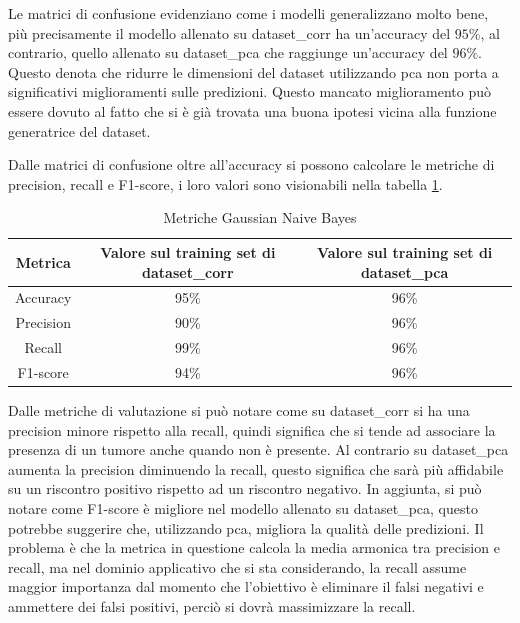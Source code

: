 Le matrici di confusione evidenziano come i modelli generalizzano molto bene, più
precisamente il modello allenato su dataset\_corr ha un'accuracy del $95\%$, al 
contrario, quello allenato su dataset\_pca che raggiunge un'accuracy del $96\%$. 
Questo denota che ridurre le dimensioni del dataset utilizzando pca non porta a 
significativi miglioramenti sulle predizioni. Questo mancato miglioramento può 
essere dovuto al fatto che si è già trovata una buona ipotesi vicina alla 
funzione generatrice del dataset.

Dalle matrici di confusione oltre all'accuracy si possono calcolare le metriche
di precision, recall e F1-score, i loro valori sono visionabili nella tabella
\ref{tab:risultatiBayes}.

\begin{table}[!ht]
    \centering
    \begin{tabular}{@{}ccc@{}}
        \toprule
        \rowcolor[HTML]{EFEFEF} 
        \textbf{Metrica} & \textbf{Valore sul training set di dataset\_corr} & \textbf{Valore sul training set di dataset\_pca} \\ \midrule
        Accuracy  & 95\% & 96\% \\
        Precision & 90\% & 96\% \\
        Recall    & 99\% & 96\% \\
        F1-score  & 94\% & 96\% \\ \bottomrule
        \end{tabular}
    \caption{Metriche Gaussian Naive Bayes}
    \label{tab:risultatiBayes}
\end{table}

Dalle metriche di valutazione si può notare come su dataset\_corr si ha una 
precision minore rispetto alla recall, quindi significa che si tende ad associare 
la presenza di un tumore anche quando non è presente. Al contrario su dataset\_pca 
aumenta la precision diminuendo la recall, questo significa che sarà più 
affidabile su un riscontro positivo rispetto ad un riscontro negativo. In aggiunta, 
si può notare come F1-score è migliore nel modello allenato su dataset\_pca, 
questo potrebbe suggerire che, utilizzando pca, migliora la qualità delle 
predizioni. Il problema è che la metrica in questione calcola la media armonica 
tra precision e recall, ma nel dominio applicativo che si sta considerando, la 
recall assume maggior importanza dal momento che l'obiettivo è eliminare il falsi 
negativi e ammettere dei falsi positivi, perciò si dovrà massimizzare la recall.

